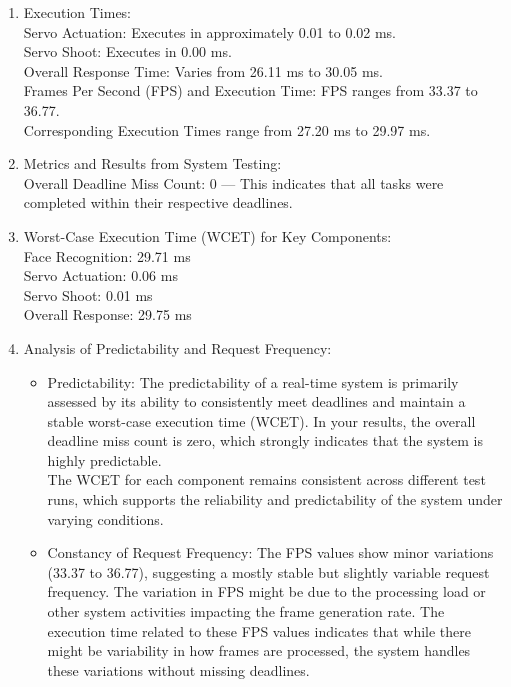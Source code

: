 \documentclass[a4paper,11pt]{article}%
\begin{document}
\begin{enumerate}
    \item Execution Times:\\
    Servo Actuation: Executes in approximately 0.01 to 0.02 ms.\\
    Servo Shoot: Executes in 0.00 ms.\\
    Overall Response Time: Varies from 26.11 ms to 30.05 ms.\\
    Frames Per Second (FPS) and Execution Time: FPS ranges from 33.37 to 36.77.\\
    Corresponding Execution Times range from 27.20 ms to 29.97 ms.\\
    
    \item Metrics and Results from System Testing:\\
    Overall Deadline Miss Count: 0 — This indicates that all tasks were completed within their respective deadlines.
    
    \item Worst-Case Execution Time (WCET) for Key Components:\\
    Face Recognition: 29.71 ms\\
    Servo Actuation: 0.06 ms\\
    Servo Shoot: 0.01 ms\\
    Overall Response: 29.75 ms
    
    \item Analysis of Predictability and Request Frequency:
    \begin{itemize}
        \item  Predictability:
        The predictability of a real-time system is primarily assessed by its ability to consistently meet deadlines and maintain a stable worst-case execution time (WCET). In your results, the overall deadline miss count is zero, which strongly indicates that the system is highly predictable.\\
        The WCET for each component remains consistent across different test runs, which supports the reliability and predictability of the system under varying conditions.
        \item Constancy of Request Frequency:
        The FPS values show minor variations (33.37 to 36.77), suggesting a mostly stable but slightly variable request frequency. The variation in FPS might be due to the processing load or other system activities impacting the frame generation rate.
        The execution time related to these FPS values indicates that while there might be variability in how frames are processed, the system handles these variations without missing deadlines.
    \end{itemize}
   
\end{enumerate}
\end{document}
